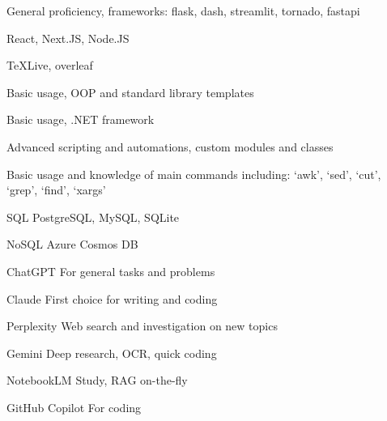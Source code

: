 

\begin{cvskills}
  {General proficiency, frameworks: flask, dash, streamlit, tornado, fastapi}

  {React, Next.JS, Node.JS}

  {TeXLive, overleaf}

  {Basic usage, OOP and standard library templates}

  {Basic usage, .NET framework}

  {Advanced scripting and automations, custom modules and classes}

  {Basic usage and knowledge of main commands including: `awk', `sed', `cut', `grep', `find', `xargs'}

\end{cvskills}

\cvsectiondivider[0.5\textwidth]


\begin{cvskills}
  \cvskill
  {SQL}
  {PostgreSQL, MySQL, SQLite}

  \cvskill
  {NoSQL}
  {Azure Cosmos DB}

\end{cvskills}

\cvsectiondivider[0.5\textwidth]


\begin{cvskills}
    \cvskill
    {ChatGPT}
    {For general tasks and problems}

    \cvskill
    {Claude}
    {First choice for writing and coding}

    \cvskill
    {Perplexity}
    {Web search and investigation on new topics}

    \cvskill
    {Gemini}
    {Deep research, OCR, quick coding}

    \cvskill
    {NotebookLM}
    {Study, RAG on-the-fly}
    
    \cvskill
    {GitHub Copilot}
    {For coding}



\end{cvskills}

